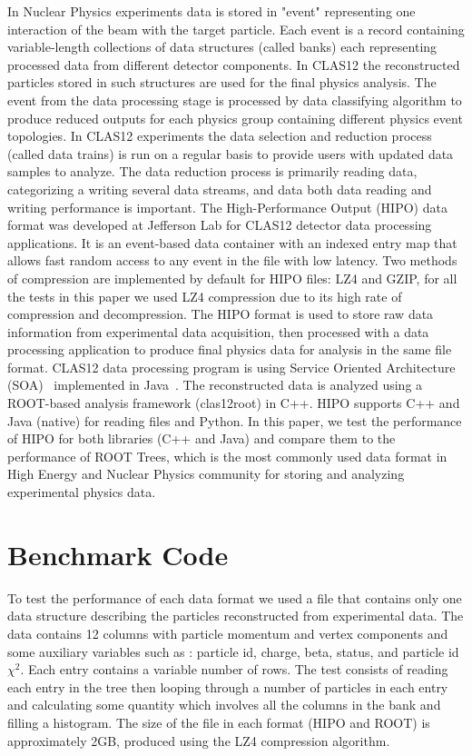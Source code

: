 \documentclass[preprint,12pt]{elsarticle}
\begin{document}
In Nuclear Physics experiments data is stored in "event" representing one interaction of the beam with the target particle. 
Each event is a record containing variable-length collections of data structures (called banks) each representing processed 
data from different detector components. 
In CLAS12 the reconstructed particles stored in such structures are used for the final physics analysis. The event from the data 
processing stage is processed by data classifying algorithm to produce reduced outputs for each physics group containing 
different physics event topologies. In CLAS12 experiments the data selection and reduction process (called data trains) is
run on a regular basis to provide users with updated data samples to analyze. The data reduction process is primarily reading
data, categorizing a writing several data streams, and data both data reading and writing performance is important.
The High-Performance Output (HIPO) data format was developed at Jefferson Lab for CLAS12 detector data processing 
applications. It is an event-based data container with an indexed entry map that allows fast random access to any event in the file
with low latency. Two methods of compression are implemented by default for HIPO files: LZ4 and GZIP, for all the tests in this 
paper we used LZ4 compression due to its high rate of compression and decompression. 
The HIPO format is used to store raw data information from experimental data acquisition, then processed with a data processing 
application to produce final physics data for analysis in the same file format. 
CLAS12 data processing program is using Service Oriented Architecture (SOA)~\cite{Gyurjyan:2011zz} implemented in Java~\cite{Ziegler:2020gsr}. 
The reconstructed data is analyzed using a ROOT-based analysis framework (clas12root) in C++. HIPO supports C++ and Java (native) for reading files
and Python. In this paper, we test the performance of HIPO for both libraries (C++ and Java) and compare them to the performance of
ROOT Trees, which is the most commonly used data format in High Energy and Nuclear Physics community for storing and analyzing
experimental physics data.

\section{Benchmark Code}

To test the performance of each data format we used a file that contains only one data structure 
describing the particles reconstructed from experimental data. The data contains 12 columns 
with particle momentum and vertex components and some auxiliary variables such as :
particle id, charge, beta, status, and particle id $\chi^2$. Each entry contains a variable number of
rows. The test consists of reading each entry in the tree then looping through a number of particles
in each entry and calculating some quantity which involves all the columns in the bank and filling a histogram.
The size of the file in each format (HIPO and ROOT) is approximately 2GB, produced using the LZ4 
compression algorithm. 
\end{document}

